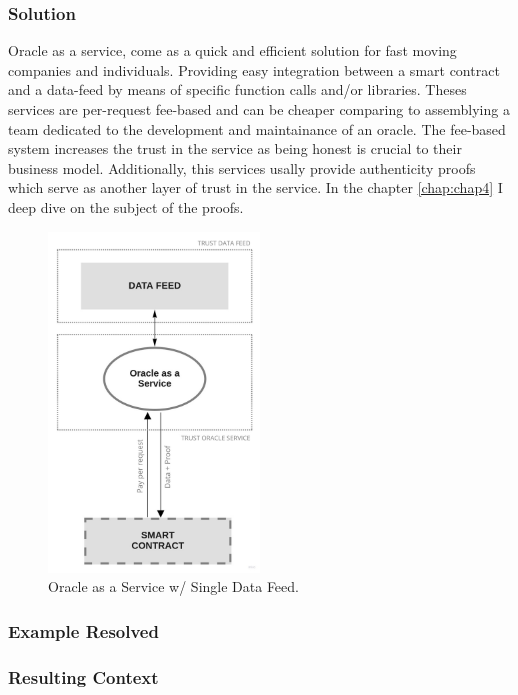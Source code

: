 \subsubsection{Solution}
Oracle as a service, come as a quick and efficient solution for fast moving companies and individuals. Providing easy integration between a smart contract and a data-feed by means of specific function calls and/or libraries. Theses services are per-request fee-based and can be cheaper comparing to assemblying a team dedicated to the development and maintainance of an oracle. The fee-based system increases the trust in the service as being honest is crucial to their business model. Additionally, this services usally provide authenticity proofs which serve as another layer of trust in the service. In the chapter \ref{chap:chap4} I deep dive on the subject of the proofs.

\begin{figure}[t]
  \begin{center}
    \leavevmode
    \includegraphics[width=0.5\textwidth]{figures/oraclearch1.jpg}
    \caption{Oracle as a Service w/ Single Data Feed.}
    \label{fig:/figures/paper-screening}
  \end{center}
\end{figure}

\subsubsection{Example Resolved}


\subsubsection{Resulting Context}

